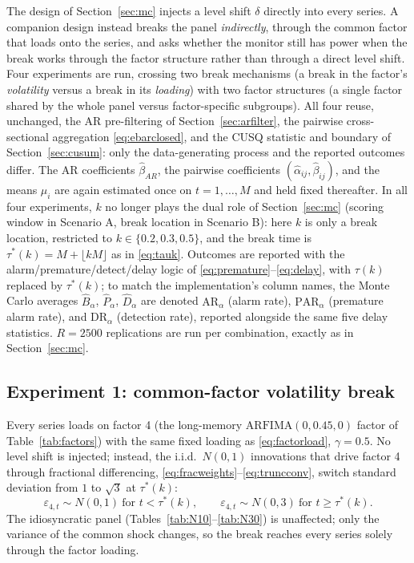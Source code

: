 \documentclass[12pt]{article}
\begin{document}
The design of Section~\ref{sec:mc} injects a level shift $\delta$ directly
into every series. A companion design instead breaks the panel
\emph{indirectly}, through the common factor that loads onto the series,
and asks whether the monitor still has power when the break works through
the factor structure rather than through a direct level shift. Four
experiments are run, crossing two break mechanisms (a break in the
factor's \emph{volatility} versus a break in its \emph{loading}) with two
factor structures (a single factor shared by the whole panel versus
factor-specific subgroups). All four reuse, unchanged, the AR pre-filtering
of Section~\ref{sec:arfilter}, the pairwise cross-sectional aggregation
\eqref{eq:ebarclosed}, and the CUSQ statistic and boundary of
Section~\ref{sec:cusum}: only the data-generating process and the reported
outcomes differ. The AR coefficients $\hat\beta_{AR}$, the pairwise
coefficients $(\hat\alpha_{ij},\hat\beta_{ij})$, and the means $\mu_i$ are
again estimated once on $t=1,\dots,M$ and held fixed thereafter. In all
four experiments, $k$ no longer plays the dual role of Section~\ref{sec:mc}
(scoring window in Scenario A, break location in Scenario B): here $k$ is
only a break location, restricted to $k\in\{0.2,0.3,0.5\}$, and the break
time is $\tau^*(k) = M + \lfloor kM\rfloor$ as in \eqref{eq:tauk}. Outcomes
are reported with the alarm/premature/detect/delay logic of
\eqref{eq:premature}--\eqref{eq:delay}, with $\tau(k)$ replaced by
$\tau^*(k)$; to match the implementation's column names, the Monte Carlo
averages $\widehat B_\alpha$, $\widehat P_\alpha$, $\widehat D_\alpha$ are
denoted $\mathrm{AR}_\alpha$ (alarm rate), $\mathrm{PAR}_\alpha$ (premature
alarm rate), and $\mathrm{DR}_\alpha$ (detection rate), reported alongside
the same five delay statistics. $R=2500$ replications are run per
combination, exactly as in Section~\ref{sec:mc}.

\subsection{Experiment 1: common-factor volatility break}
\label{subsec:exp1}

Every series loads on factor 4 (the long-memory $\mathrm{ARFIMA}(0,0.45,0)$
factor of Table~\ref{tab:factors}) with the same fixed loading as
\eqref{eq:factorload}, $\gamma=0.5$. No level shift is injected; instead,
the i.i.d.\ $N(0,1)$ innovations that drive factor 4 through fractional
differencing, \eqref{eq:fracweights}--\eqref{eq:truncconv}, switch standard
deviation from $1$ to $\sqrt{3}$ at $\tau^*(k)$:
\begin{equation}
\varepsilon_{4,t} \sim N(0,1)\ \text{for } t < \tau^*(k), \qquad
\varepsilon_{4,t} \sim N(0,3)\ \text{for } t \ge \tau^*(k).
\label{eq:exp1vol}
\end{equation}
The idiosyncratic panel (Tables~\ref{tab:N10}--\ref{tab:N30}) is unaffected;
only the variance of the common shock changes, so the break reaches every
series solely through the factor loading.
\end{document}
